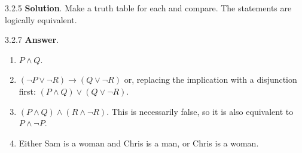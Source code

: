 \documentclass[11pt,]{book}
\theoremstyle{ptxplainnotitle}
\theoremstyle{ptxplaintitle}
\theoremstyle{ptxdefinitionnotitle}
\theoremstyle{ptxdefinitiontitle}
\theoremstyle{ptxdefinitionnotitle}
\theoremstyle{ptxdefinitiontitle}
\theoremstyle{ptxdefinitionnotitle}
\theoremstyle{ptxdefinitiontitle}
\theoremstyle{ptxdefinitiontitlenonumber}
\theoremstyle{ptxdefinitiontitlenonumber}
\numberwithin{equation}{chapter}
\newcommand{\imp}{\rightarrow}
\begin{document}
\begin{divisionexercise}{3.2.5}
\textbf{Solution}.\quad%
\hypertarget{p-2325}{}%
Make a truth table for each and compare. The statements are logically equivalent.%
\end{divisionexercise}%
\begin{divisionexercise}{3.2.7}
\textbf{Answer}.\quad%
\hypertarget{p-2329}{}%
\leavevmode%
\begin{enumerate}[label=(\alph*)]
\item\hypertarget{li-1194}{}\(P \wedge Q\).%
\item\hypertarget{li-1195}{}\((\neg P \vee \neg R) \imp (Q \vee \neg R)\) or, replacing the implication with a disjunction first: \((P \wedge Q) \vee (Q \vee \neg R)\).%
\item\hypertarget{li-1196}{}\hypertarget{p-2330}{}%
\((P \wedge Q) \wedge (R \wedge \neg R)\). This is necessarily false, so it is also equivalent to \(P \wedge \neg P\).%
\item\hypertarget{li-1197}{}\hypertarget{p-2331}{}%
Either Sam is a woman and Chris is a man, or Chris is a woman.%
\end{enumerate}
%
\end{divisionexercise}%
\end{document}
